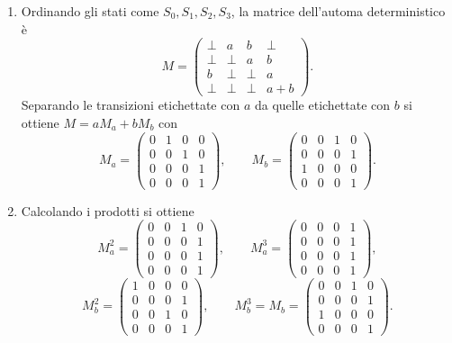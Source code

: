 \begin{sol}
\begin{enumerate}
\begin{enumerate}
\[\begin{tikzpicture}[
            >=stealth', shorten >=1pt, auto,
            every state/.style={circle, draw, fill=white, minimum size=0.8cm, inner sep=1pt}
        ]
        \draw[->] ([shift={(-0.7,0.7)}]s0s.center) -- (s0s);
        \draw[->, very thick] (s0s) -- node {$((aa+b)b)^*(aa+b)$} (sf);
        \end{tikzpicture}
        \]
    \end{enumerate}
    L'espressione regolare cercata è quindi $((aa+b)b)^*(aa+b)$.

    \item Ordinando gli stati come $S_0,S_1,S_2,S_3$, la matrice dell'automa deterministico è
    \[
    M=\begin{pmatrix}
    \bot & a & b & \bot \\
    \bot & \bot & a & b \\
    b & \bot & \bot & a \\
    \bot & \bot & \bot & a+b
    \end{pmatrix}.
    \]
    Separando le transizioni etichettate con $a$ da quelle etichettate con $b$ si ottiene $M=aM_a+bM_b$ con
    \[
    M_a=\begin{pmatrix}
    0&1&0&0\\
    0&0&1&0\\
    0&0&0&1\\
    0&0&0&1
    \end{pmatrix},\qquad
    M_b=\begin{pmatrix}
    0&0&1&0\\
    0&0&0&1\\
    1&0&0&0\\
    0&0&0&1
    \end{pmatrix}.
    \]

    \item Calcolando i prodotti si ottiene
    \[
    M_a^2=\begin{pmatrix}
    0&0&1&0\\
    0&0&0&1\\
    0&0&0&1\\
    0&0&0&1
    \end{pmatrix},\qquad
    M_a^3=\begin{pmatrix}
    0&0&0&1\\
    0&0&0&1\\
    0&0&0&1\\
    0&0&0&1
    \end{pmatrix},
    \]
    \[
    M_b^2=\begin{pmatrix}
    1&0&0&0\\
    0&0&0&1\\
    0&0&1&0\\
    0&0&0&1
    \end{pmatrix},\qquad
    M_b^3=M_b=\begin{pmatrix}
    0&0&1&0\\
    0&0&0&1\\
    1&0&0&0\\
    0&0&0&1
    \end{pmatrix}.
    \]


\end{enumerate}
\end{sol}
